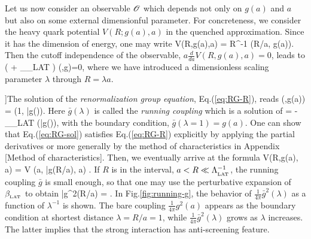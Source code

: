 Let us now consider an observable ${\cal O}$ which depends 
not only on $g(a)$ and $a$ but also on some external dimensionful parameter.
For concreteness, we consider the heavy quark potential $V(R; g(a),a)$ in the 
quenched approximation.  Since it has the dimension of energy, one may write
\beq
V(R,g(a),a) = R^{-1}  (R/a, g(a)).
\eeq
Then the cutoff independence of the observable, $a \frac{d}{da}V(R,g(a),a)=0$,  leads to
\beq
\left( \lambda \frac{\partial}{\partial \lambda} + \beta_{_{\rm LAT}}  \right)  (\lambda,g)=0,
\label{eq:RG-R}
\eeq
where we have introduced 
a dimensionless  scaling parameter $\lambda$ through $R=\lambda a$.

]The solution of the {\it renormalization group equation}, Eq.(\ref{eq:RG-R}), reads
\beq
\label{eq:RG-sol}
  (\lambda,g(a)) =  (1, \bar{g}(\lambda)).
 \eeq
 Here $\bar{g}(\lambda)$ is called the {\it running coupling} which is  a solution of
\beq
\lambda {}  = - \beta_{_{\rm LAT}} (\bar{g}(\lambda)),
\eeq
with the boundary condition, $\bar{g}(\lambda=1)= g(a)$.
One can show that  Eq.(\ref{eq:RG-sol})  satisfies Eq.(\ref{eq:RG-R}) explicitly by applying the partial derivatives 
 or more generally by the method of characteristics in Appendix [Method of characteristics].
Then, we eventually arrive at the formula 
\beq
V(R,g(a), a) =  V (a, \bar{g}(R/a), a) .
\eeq
If $R$ is  in the interval,  $a < R \ll  \Lambda_{_{\rm LAT}}^{-1}$, the running coupling $\bar{g}$ is small enough, so that 
one may use the perturbative expansion of $\beta_{_{\rm LAT}}$ to obtain
\beq
\bar{g}^2(R/a) \simeq {} =  . 
\label{eq:running-R}
\eeq 
In Fig.\ref{fig:running-g}, the behavior of $\frac{1}{4\pi}\bar{g}^2(\lambda)$  as a function of $\lambda^{-1}$ is shown.
The bare coupling $\frac{1}{4\pi}g^2(a)$ appears as the boundary condition at shortest distance $\lambda=R/a=1$,
while $\frac{1}{4\pi} \bar{g}^2(\lambda)$ grows  as $\lambda$ increases.
The latter implies that the strong interaction has anti-screening feature.

